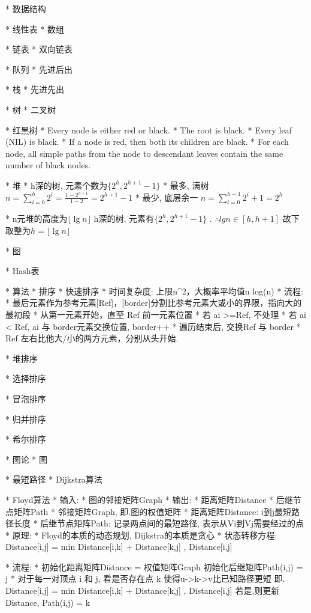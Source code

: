 
* 数据结构

	* 线性表
		* 数组

		* 链表
			* 双向链表

		* 队列
			* 先进后出

		* 栈
			* 先进先出

	* 树
		* 二叉树

		* 红黑树
			\Property
				* Every node is either red or black.
				* The root is black.
				* Every leaf (NIL) is black.
				* If a node is red, then both its children are black.
				* For each node, all simple paths from the node to descendant leaves contain the same number of black nodes.

		* 堆
			\Property
				* h深的树, 元素个数为$\{ 2^h, 2^{h+1} - 1 \}$ 
					\Proof
						* 最多, 满树
						$n = \sum_{i=0}^h 2^i = \frac{1 - 2^{h+1}}{1 - 2} = 2^{h+1} - 1$
						* 最少, 底层余一
						$n = \sum_{i=0}^{h-1} 2^i + 1 = 2^h$

				* n元堆的高度为$⌊\lg n⌋$
					\Proof
						h深的树, 元素有$\{ 2^h, 2^{h+1} - 1 \}$
						. $∴ lg n \in [h, h + 1]$
						故下取整为$ h = ⌊\lg n⌋$

	* 图

	* Hash表

* 算法
	* 排序
		* 快速排序
			\Property
				* 时间复杂度: 上限n^2，大概率平均值n log(n)
				* 流程: 
					* 最后元素作为参考元素[Ref]，[border]分割比参考元素大或小的界限，指向大的最初段
					* 从第一元素开始，直至 Ref 前一元素位置
						* 若 ai >=Ref, 不处理
						* 若 ai < Ref, ai 与 border元素交换位置, border++
					* 遍历结束后, 交换Ref 与 border
					* Ref 左右比他大/小的两方元素，分别从头开始. 
			
		* 堆排序

		* 选择排序

		* 冒泡排序

		* 归并排序

		* 希尔排序

	* 图论
		* 图

		* 最短路径
			* Dijkstra算法

			* Floyd算法
				* 输入:	* 图的邻接矩阵Graph
				* 输出: * 距离矩阵Distance	* 后继节点矩阵Path
					* 邻接矩阵Graph, 即.图的权值矩阵
					* 距离矩阵Distance: i到j最短路径长度
					* 后继节点矩阵Path: 记录两点间的最短路径, 表示从Vi到Vj需要经过的点
				* 原理:
					* Floyd的本质的动态规划, Dijkstra的本质是贪心
					* 状态转移方程:
						Distance[i,j] = min{ Distance[i,k] + Distance[k,j] , Distance[i,j] }

				* 流程:
					* 初始化距离矩阵Distance = 权值矩阵Graph
						初始化后继矩阵Path(i,j) = j
					* 对于每一对顶点 i 和 j, 看是否存在点 k 使得u->k->v比已知路径更短
							即. Distance[i,j] = min{ Distance[i,k] + Distance[k,j] , Distance[i,j] }
						若是,则更新Distance, Path(i,j) = k
				
